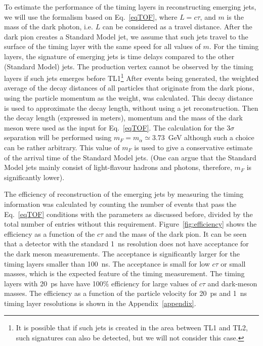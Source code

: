 To estimate the performance of the timing layers in reconstructing emerging jets, 
we will use the formalism based on Eq.~\ref{eqTOF}, where $L=c\tau$, and $m$ is the mass
of the dark photon, i.e. $L$ can be considered as a travel distance. After the dark pion creates a Standard Model jet, we assume that
such jets travel to the surface of the timing layer with the same speed for all values of $m$.
For the timing layers, the signature of emerging jets is time delays compared to the other (Standard Model) jets. The  production vertex
cannot be observed by the timing layers if such jets emerges before TL1\footnote{It is possible that if such jets is created in the area between TL1 and TL2,
such signatures can also be detected, but we will not consider this case.}
After events being generated, the weighted average of the decay distances of all particles that originate from
the dark pions, using the particle momentum as the weight, was calculated. This decay distance is used 
to approximate the decay length, without using a jet reconstruction.  Then the decay length (expressed in meters),  
momentum and the mass of the dark meson were used as the input for Eq.~\ref{eqTOF}.
The  calculation for the $3\sigma$ separation will be performed using $m_F=m_{\alpha}\simeq 3.73$~GeV although such a choice can be rather arbitrary.
This value of $m_F$ is used to give a conservative estimate of the arrival time of the Standard Model jets. 
(One can argue that the Standard Model jets mainly consist of light-flavour hadrons and photons, therefore, $m_F$ is significantly lower). 

The efficiency of reconstruction of the emerging jets by measuring the timing information was calculated by counting the number of events that pass the 
Eq.~\ref{eqTOF} conditions  with the parameters as discussed before, divided by the total number of entries
without this requirement. Figure~\ref{fig:efficiency} shows the efficiency
as a function of the $c\tau$ and the mass of the dark pion. It can be seen that a detector with the standard 1~ns resolution does
not have acceptance for the dark meson measurements. The acceptance is significantly larger for the timing layers smaller than 100~ns.
The acceptance is small for low $c\tau$ or small masses, which is the expected feature of the timing measurement.
The timing layers with 20~ps have have 100\% efficiency for large values of $c\tau$ and dark-meson masses.
The efficiency as a function of the particle velocity for 20~ps and 1~ns timing layer resolutions
is shown in the Appendix~\ref{appendix}.


